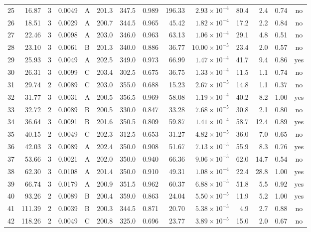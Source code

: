 \begin{landscape}
\begin{longtable}{rrrrlrrrrrrrrc}
25 & 16.87 & 3 & 0.0049 & A & 201.3 & 347.5 & 0.989 & 196.33 & $2.93\times10^{-4}$ & 80.4 & 2.4 & 0.74 & no \\
26 & 18.51 & 3 & 0.0029 & A & 200.7 & 344.5 & 0.965 & 45.42 & $1.82\times10^{-4}$ & 17.2 & 2.2 & 0.84 & no \\
27 & 22.46 & 3 & 0.0098 & A & 203.0 & 346.0 & 0.963 & 63.13 & $1.06\times10^{-4}$ & 29.1 & 4.8 & 0.51 & no \\
28 & 23.10 & 3 & 0.0061 & B & 201.3 & 340.0 & 0.886 & 36.77 & $10.00\times10^{-5}$ & 23.4 & 2.0 & 0.57 & no \\
29 & 25.93 & 3 & 0.0049 & A & 202.5 & 349.0 & 0.973 & 66.99 & $1.47\times10^{-4}$ & 41.7 & 9.4 & 0.86 & yes \\
30 & 26.31 & 3 & 0.0099 & C & 203.4 & 302.5 & 0.675 & 36.75 & $1.33\times10^{-4}$ & 11.5 & 1.1 & 0.74 & no \\
31 & 29.74 & 2 & 0.0089 & C & 203.0 & 355.0 & 0.688 & 15.23 & $2.67\times10^{-5}$ & 14.8 & 1.1 & 0.37 & no \\
32 & 31.77 & 3 & 0.0031 & A & 200.5 & 356.5 & 0.969 & 58.08 & $1.19\times10^{-4}$ & 40.2 & 8.2 & 1.00 & yes \\
33 & 32.72 & 2 & 0.0089 & B & 200.5 & 330.0 & 0.847 & 33.28 & $7.68\times10^{-5}$ & 30.8 & 2.1 & 0.80 & no \\
34 & 36.64 & 3 & 0.0091 & B & 201.6 & 350.5 & 0.809 & 59.87 & $1.41\times10^{-4}$ & 58.7 & 12.4 & 0.89 & yes \\
35 & 40.15 & 2 & 0.0049 & C & 202.3 & 312.5 & 0.653 & 31.27 & $4.82\times10^{-5}$ & 36.0 & 7.0 & 0.65 & no \\
36 & 42.03 & 3 & 0.0089 & A & 202.4 & 350.0 & 0.908 & 51.67 & $7.13\times10^{-5}$ & 55.9 & 8.3 & 0.76 & yes \\
37 & 53.66 & 3 & 0.0021 & A & 202.0 & 350.0 & 0.940 & 66.36 & $9.06\times10^{-5}$ & 62.0 & 14.7 & 0.54 & no \\
38 & 62.30 & 3 & 0.0108 & A & 201.4 & 350.0 & 0.910 & 49.31 & $1.08\times10^{-4}$ & 22.4 & 28.8 & 1.00 & yes \\
39 & 66.74 & 3 & 0.0179 & A & 200.9 & 351.5 & 0.962 & 60.37 & $6.88\times10^{-5}$ & 51.8 & 5.5 & 0.92 & yes \\
40 & 93.26 & 2 & 0.0089 & B & 200.4 & 359.0 & 0.863 & 24.04 & $5.50\times10^{-5}$ & 11.9 & 5.2 & 1.00 & yes \\
41 & 111.39 & 2 & 0.0039 & B & 200.3 & 344.5 & 0.871 & 20.70 & $5.38\times10^{-5}$ & 4.9 & 2.7 & 0.88 & no \\
42 & 118.26 & 2 & 0.0049 & C & 200.8 & 325.0 & 0.696 & 23.77 & $3.89\times10^{-5}$ & 15.0 & 2.0 & 0.67 & no \\

\end{longtable}
\end{landscape}
